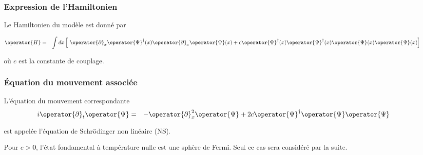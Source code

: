 
\subsubsection{Expression de l’Hamiltonien}
Le Hamiltonien du modèle est donné par

\begin{eqnarray}
	\operator{H} & = & \int dx \left [ \operator{\partial}_x \operator{\Psi}^\dag (x) \operator{\partial}_x \operator{\Psi}(x) + c \operator{\Psi}^\dag (x) \operator{\Psi}^\dag (x) \operator{\Psi} (x) \operator{\Psi} (x) \right ] \label{chap:1:hal.mod}
\end{eqnarray}


où \( c \) est la constante de couplage. 

\subsubsection{Équation du mouvement associée}

L'équation du mouvement correspondante
\begin{eqnarray}
	i \operator{\partial}_t \operator{\Psi}	 & = & - \operator{\partial}_x^2 \operator{\Psi} + 2 c \operator{\Psi}^\dag\operator{\Psi} \operator{\Psi}
\end{eqnarray}

est appelée l'équation de Schrödinger non linéaire (NS).

Pour $c > 0$, l'état fondamental à température nulle est une sphère de Fermi. Seul ce cas sera considéré par la suite. 

